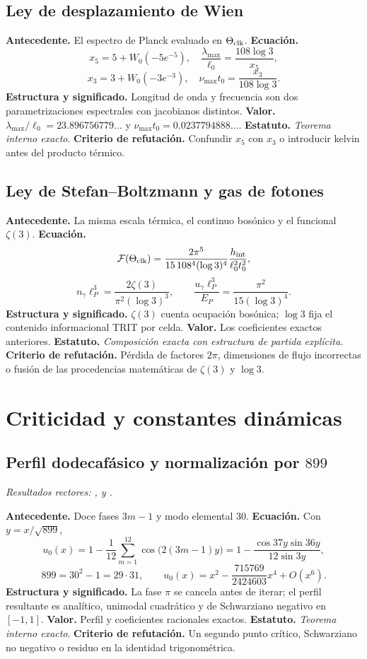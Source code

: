 \subsection*{Ley de desplazamiento de Wien }
\textbf{Antecedente.} El espectro de Planck evaluado en
\(\Theta_{\rm clk}\). \textbf{Ecuaci\'on.}
\[
x_5=5+W_0(-5e^{-5}),\quad
\frac{\lambda_{\max}}{\ell_0}=\frac{108\log3}{x_5},
\]
\[
x_3=3+W_0(-3e^{-3}),\quad
\nu_{\max}t_0=\frac{x_3}{108\log3}.
\]
\textbf{Estructura y significado.} Longitud de onda y frecuencia son dos
parametrizaciones espectrales con jacobianos distintos. \textbf{Valor.}
\(\lambda_{\max}/\ell_0=23.896756779\ldots\) y
\(\nu_{\max}t_0=0.0237794888\ldots\). \textbf{Estatuto.}
\emph{Teorema interno exacto}. \textbf{Criterio de refutación.} Confundir \(x_5\) con \(x_3\) o
introducir kelvin antes del producto t\'ermico.

\subsection*{Ley de Stefan--Boltzmann y gas de fotones }
\textbf{Antecedente.} La misma escala t\'ermica, el continuo bos\'onico y el
funcional \(\zeta(3)\). \textbf{Ecuaci\'on.}
\[
\mathcal F(\Theta_{\rm clk})
=\frac{2\pi^5}{15\,108^4(\log3)^4}
\frac{h_{\rm int}}{\ell_0^2t_0^2},
\]
\[
n_\gamma\ell_P^3=\frac{2\zeta(3)}{\pi^2(\log3)^3},
\qquad
\frac{u_\gamma\ell_P^3}{E_P}=\frac{\pi^2}{15(\log3)^4}.
\]
\textbf{Estructura y significado.} \(\zeta(3)\) cuenta ocupaci\'on bos\'onica;
\(\log3\) fija el contenido informacional TRIT por celda. \textbf{Valor.}
Los coeficientes
exactos anteriores. \textbf{Estatuto.} \emph{Composici\'on exacta con
estructura de partida expl\'icita}. \textbf{Criterio de refutación.} P\'erdida de factores
\(2\pi\), dimensiones de flujo incorrectas o fusi\'on de las procedencias matemáticas de
\(\zeta(3)\) y \(\log3\).

\section{Criticidad y constantes din\'amicas}

\subsection*{Perfil dodecaf\'asico y normalizaci\'on por \(899\)}
\noindent\textit{Resultados rectores: , y
.}\par
\textbf{Antecedente.} Doce fases \(3m-1\) y modo elemental \(30\).
\textbf{Ecuaci\'on.} Con \(y=x/\sqrt{899}\),
\[
u_0(x)=1-\frac1{12}\sum_{m=1}^{12}
\cos\!\bigl(2(3m-1)y\bigr)
=1-\frac{\cos37y\sin36y}{12\sin3y},
\]
\[
899=30^2-1=29\cdot31,\qquad
u_0(x)=x^2-\frac{715769}{2424603}x^4+O(x^6).
\]
\textbf{Estructura y significado.} La fase \(\pi\) se cancela antes de
iterar; el perfil resultante es anal\'itico, unimodal cuadr\'atico y de
Schwarziano negativo en \([-1,1]\). \textbf{Valor.} Perfil y coeficientes
racionales exactos. \textbf{Estatuto.} \emph{Teorema interno exacto}.
\textbf{Criterio de refutación.} Un segundo punto cr\'itico, Schwarziano no negativo o
residuo en la identidad trigonom\'etrica.


